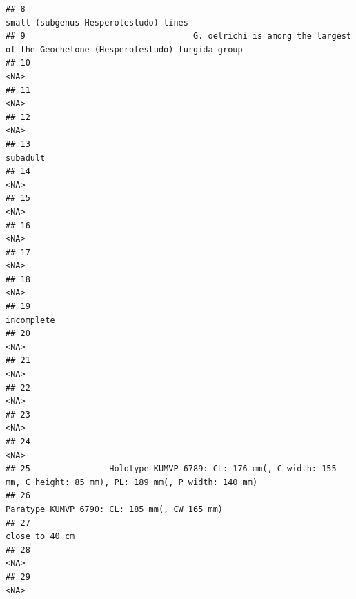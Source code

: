\documentclass[]{article}
\begin{document}
\begin{verbatim}
## 8                                                                              small (subgenus Hesperotestudo) lines
## 9                                  G. oelrichi is among the largest of the Geochelone (Hesperotestudo) turgida group
## 10                                                                                                              <NA>
## 11                                                                                                              <NA>
## 12                                                                                                              <NA>
## 13                                                                                                          subadult
## 14                                                                                                              <NA>
## 15                                                                                                              <NA>
## 16                                                                                                              <NA>
## 17                                                                                                              <NA>
## 18                                                                                                              <NA>
## 19                                                                                                        incomplete
## 20                                                                                                              <NA>
## 21                                                                                                              <NA>
## 22                                                                                                              <NA>
## 23                                                                                                              <NA>
## 24                                                                                                              <NA>
## 25                Holotype KUMVP 6789: CL: 176 mm(, C width: 155 mm, C height: 85 mm), PL: 189 mm(, P width: 140 mm)
## 26                                                                      Paratype KUMVP 6790: CL: 185 mm(, CW 165 mm)
## 27                                                                                                    close to 40 cm
## 28                                                                                                              <NA>
## 29                                                                                                              <NA>

\end{verbatim}
\end{document}
